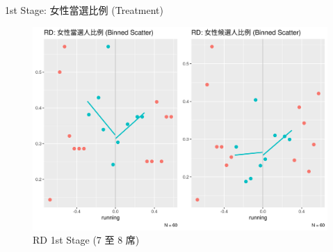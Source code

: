 \documentclass[
  10pt,
  ignorenonframetext,
  aspectratio=43,
]{beamer}
\begin{document}
\begin{frame}
\begin{block}{1st Stage: 女性當選比例 (Treatment)}
\protect\hypertarget{st-stage-ux5973ux6027ux7576ux9078ux6bd4ux4f8b-treatment}{}
\begin{figure}
\centering
\includegraphics[width=1\textwidth,height=\textheight]{assets/treatments_7to8.png}
\caption{RD 1st Stage (7 至 8 席)}
\end{figure}
\end{block}
\end{frame}
\end{document}
